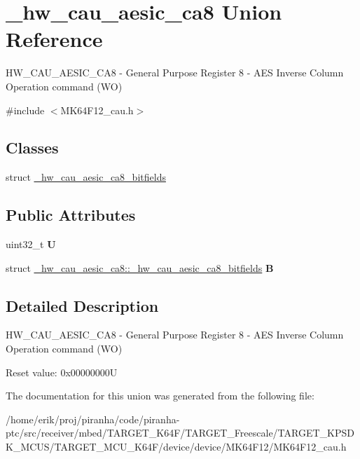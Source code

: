 \hypertarget{union__hw__cau__aesic__ca8}{}\section{\+\_\+hw\+\_\+cau\+\_\+aesic\+\_\+ca8 Union Reference}
\label{union__hw__cau__aesic__ca8}


H\+W\+\_\+\+C\+A\+U\+\_\+\+A\+E\+S\+I\+C\+\_\+\+C\+A8 -\/ General Purpose Register 8 -\/ A\+ES Inverse Column Operation command (WO)  




{\ttfamily \#include $<$M\+K64\+F12\+\_\+cau.\+h$>$}

\subsection*{Classes}
\begin{DoxyCompactItemize}
\item 
struct \hyperlink{struct__hw__cau__aesic__ca8_1_1__hw__cau__aesic__ca8__bitfields}{\+\_\+hw\+\_\+cau\+\_\+aesic\+\_\+ca8\+\_\+bitfields}
\end{DoxyCompactItemize}
\subsection*{Public Attributes}
\begin{DoxyCompactItemize}
\item 
uint32\+\_\+t {\bfseries U}\hypertarget{union__hw__cau__aesic__ca8_a6f25e1df73f465f1d52fac2ed43765af}{}\label{union__hw__cau__aesic__ca8_a6f25e1df73f465f1d52fac2ed43765af}

\item 
struct \hyperlink{struct__hw__cau__aesic__ca8_1_1__hw__cau__aesic__ca8__bitfields}{\+\_\+hw\+\_\+cau\+\_\+aesic\+\_\+ca8\+::\+\_\+hw\+\_\+cau\+\_\+aesic\+\_\+ca8\+\_\+bitfields} {\bfseries B}\hypertarget{union__hw__cau__aesic__ca8_ab9e2c799df3f969a4b24d10a09cf1a91}{}\label{union__hw__cau__aesic__ca8_ab9e2c799df3f969a4b24d10a09cf1a91}

\end{DoxyCompactItemize}


\subsection{Detailed Description}
H\+W\+\_\+\+C\+A\+U\+\_\+\+A\+E\+S\+I\+C\+\_\+\+C\+A8 -\/ General Purpose Register 8 -\/ A\+ES Inverse Column Operation command (WO) 

Reset value\+: 0x00000000U 

The documentation for this union was generated from the following file\+:\begin{DoxyCompactItemize}
\item 
/home/erik/proj/piranha/code/piranha-\/ptc/src/receiver/mbed/\+T\+A\+R\+G\+E\+T\+\_\+\+K64\+F/\+T\+A\+R\+G\+E\+T\+\_\+\+Freescale/\+T\+A\+R\+G\+E\+T\+\_\+\+K\+P\+S\+D\+K\+\_\+\+M\+C\+U\+S/\+T\+A\+R\+G\+E\+T\+\_\+\+M\+C\+U\+\_\+\+K64\+F/device/device/\+M\+K64\+F12/M\+K64\+F12\+\_\+cau.\+h\end{DoxyCompactItemize}
